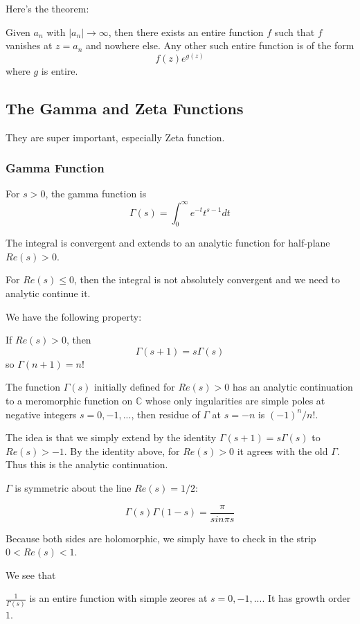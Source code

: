 \documentclass[main.tex]{subfiles}
\begin{document}
Here's the theorem:
\begin{theorem}
Given $a_n$ with $|a_n| \rightarrow \infty$, then there exists an entire function $f$ such that $f$ vanishes at $z = a_n$ and nowhere else. Any other such entire function is of the form 
$$
f(z) e^{g(z)}
$$
where $g$ is entire.
\end{theorem}


\subsection{The Gamma and Zeta Functions}
They are super important, especially Zeta function.

\subsubsection{Gamma Function}
For $s > 0$, the gamma function is 
$$
\Gamma(s) = \int_0 ^{\infty} e^{-t} t^{s-1} dt
$$

The integral is convergent and extends to an analytic function for half-plane $Re(s) > 0$.

For $Re(s) \leq 0$, then the integral is not absolutely convergent and we need to analytic continue it.

We have the following property:
\begin{lemma}
If $Re(s) > 0$, then 
$$
\Gamma(s+ 1) = s \Gamma(s)
$$
so $\Gamma(n+1) = n!$
\end{lemma}

\begin{theorem}
The function $\Gamma(s)$ initially defined for $Re(s) > 0$ has an analytic continuation to a meromorphic function on $\mathbb{C}$ whose only ingularities are simple poles at negative integers $s = 0, -1, ... $, then residue of $\Gamma$ at $s = -n$ is $(-1)^n /n!$.
\end{theorem}
The idea is that we simply extend by the identity $\Gamma(s+ 1) = s \Gamma(s)$ to $Re(s) > -1$. By the identity above, for $Re(s) > 0$ it agrees with the old $\Gamma$. Thus this is the analytic continuation.

$\Gamma$ is symmetric about the line $Re(s) = 1/2$:

\begin{theorem}
$$
\Gamma(s) \Gamma(1-s) = \frac{\pi}{sin \pi s}
$$
\end{theorem}
Because both sides are holomorphic, we simply have to check in the strip $0 < Re(s) < 1$.

We see that 
\begin{theorem}
$\frac{1}{\Gamma(s)}$ is an entire function with simple zeores at $s = 0, -1, ...$. It has growth order $1$.
\end{theorem}
\end{document}
